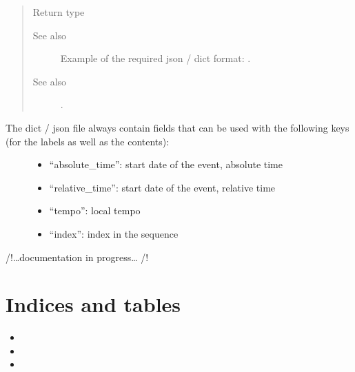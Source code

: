 \documentclass[letterpaper,10pt,english]{sphinxmanual}
\begin{document}
\begin{fulllineitems}
\begin{quote}
\begin{description}
\item[{Return type}] \leavevmode
{\hyperref[\detokenize{index:Generator.Generator}]{}}

\item[{See also}] \leavevmode
Example of the required json / dict format: .

\item[{See also}] \leavevmode
{} .

\end{description}\end{quote}
\begin{description}
\item[{The dict / json file always contain fields that can be used with the following keys (for the labels as well as the contents):}] \leavevmode\begin{itemize}
\item {} 
“absolute\_time”: start date of the event, absolute time

\item {} 
“relative\_time”: start date of the event, relative time

\item {} 
“tempo”: local tempo

\item {} 
“index”: index in the sequence

\end{itemize}

\end{description}

\end{fulllineitems}


/!…documentation in progress… /!


\chapter{Indices and tables}
\label{\detokenize{index:indices-and-tables}}\begin{itemize}
\item {} 

\item {} 

\item {} 

\end{itemize}
\end{document}
